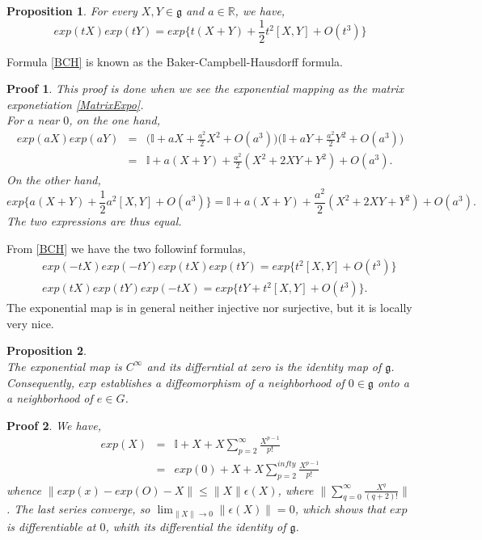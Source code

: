 \documentclass[a4paper,11pt]{article} %
\newcommand{\norm}[1]{\|{#1}\|} %
\numberwithin{equation}{section} %
\numberwithin{figure}{section} %
\newtheorem{prop}{Proposition}
\newtheorem{demo}{Proof}
\begin{document}
\begin{prop} \cite[Prop. 3.2, p.52]{Yvette2005}
For every $X, Y \in \mathfrak{g}$ and $a \in \mathbb{R}$, we have,
\begin{equation}
exp(tX) exp(tY) = exp\{t(X+Y)+\frac{1}{2}t^2[X,Y]+O(t^3)\} \label{BCH}
\end{equation}
\end{prop}

Formula \eqref{BCH} is known as the Baker-Campbell-Hausdorff formula.

\begin{demo}
This proof is done when we see the exponential mapping as the matrix exponetiation \eqref{MatrixExpo}. \\
For $a$ near $0$, on the one hand,
\begin{eqnarray}
exp(aX) exp(aY) &=& \big( \mathbb{I} + aX + \frac{a^2}{2} X^2 + O(a^3) \big) \big( \mathbb{I} + aY + \frac{a^2}{2} Y^2 + O(a^3) \big) \\
&=& \mathbb{I} + a(X+Y) + \frac{a^2}{2}(X^2 + 2XY + Y^2) + O(a^3).
\end{eqnarray}
On the other hand,
\begin{equation}
exp\{a(X+Y)+\frac{1}{2}a^2[X,Y]+O(a^3)\} = \mathbb{I} + a(X+Y) + \frac{a^2}{2}(X^2 + 2XY + Y^2) + O(a^3). 
\end{equation}
The two expressions are thus equal.
\end{demo}

From \eqref{BCH} we have the two followinf formulas,
\begin{eqnarray}
 && exp(-tX) exp(-tY) exp(tX) exp(tY) = exp\{t^2[X,Y]+O(t^3)\}\\
 && exp(tX) exp(tY) exp(-tX) = exp\{tY+t^2[X,Y]+O(t^3)\}. 
\end{eqnarray}
The exponential map is in general neither injective nor surjective, but it is locally very nice.

\begin{prop} \cite[Prop. 3.2, p. 52]{Yvette2005} \\
The exponential map is $C^\infty$ and its differntial at zero is the  identity map of $\mathfrak{g}$. Consequently, $exp$ establishes a diffeomorphism of a neighborhood of $0\in\mathfrak{g}$ onto a a neighborhood of $e\in G$.
\end{prop}

\begin{demo}
We have,
\begin{eqnarray}
exp(X) &=& \mathbb{I} + X + X \sum^{\infty}_{p=2} \frac{X^{p-1}}{p!} \\
&=& exp(0) + X + X \sum^{infty}_{p=2} \frac{X^{p-1}}{p!}
\end{eqnarray}
whence $\norm{exp(x) - exp(O) - X} \leq \norm{X} \epsilon(X)$, where $\norm{\sum^{\infty}_{q=0} \frac{X^{q}}{(q+2)!}}$. The last series converge, so $\lim_{\norm{X}\to0} \norm{\epsilon(X)} = 0$, which shows that $exp$ is differentiable at $0$, whith its differential the identity of $\mathfrak{g}$. 
\end{demo}
\end{document}
